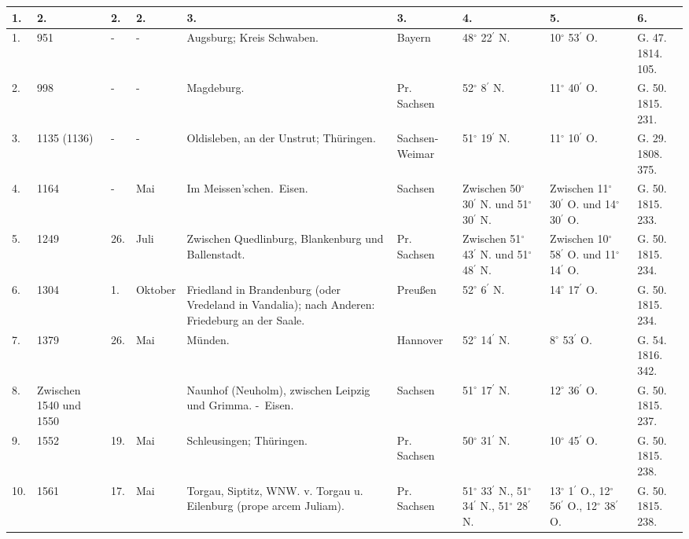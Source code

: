 \documentclass[a4paper, 8pt, oneside, polutonikogreek, german]{article}
\begin{document}
\begin{center}
    \footnotesize
    \begin{longtable}{|p{3mm}|p{10mm}|p{5mm}|p{13mm}|p{25mm}|p{13mm}|p{10mm}|p{10mm}|p{11mm}|}
    \hline
        1. & 2. & 2. & 2. & 3. & 3. & 4. & 5. & 6. \\ \hline
        1. & 951 & - & - & Augsburg; Kreis Schwaben. & Bayern & 48$^\circ$ 22$^\prime$ N. & 10$^\circ$ 53$^\prime$ O. & G. 47. 1814. 105. \\ \hline
        2. & 998 & - & - & Magdeburg. & Pr. Sachsen & 52$^\circ$ 8$^\prime$ N. & 11$^\circ$ 40$^\prime$ O. & G. 50. 1815. 231. \\ \hline
        3. & 1135 (1136) & - & - & Oldisleben, an der Unstrut; Thüringen. & Sachsen-Weimar & 51$^\circ$ 19$^\prime$ N. & 11$^\circ$ 10$^\prime$ O. & G. 29. 1808. 375. \\ \hline
        4. & 1164 & - & Mai & Im Meissen’schen. Eisen. & Sachsen & Zwischen 50$^\circ$ 30$^\prime$ N. und 51$^\circ$ 30$^\prime$ N. & Zwischen 11$^\circ$ 30$^\prime$ O. und 14$^\circ$ 30$^\prime$ O. & G. 50. 1815. 233. \\ \hline
        5. & 1249 & 26. & Juli & Zwischen Quedlinburg, Blankenburg und Ballenstadt. & Pr. Sachsen & Zwischen 51$^\circ$ 43$^\prime$ N. und 51$^\circ$ 48$^\prime$ N. & Zwischen 10$^\circ$ 58$^\prime$ O. und 11$^\circ$ 14$^\prime$ O. & G. 50. 1815. 234. \\ \hline
        6. & 1304 & 1. & Oktober & Friedland in Brandenburg (oder Vredeland in Vandalia); nach Anderen: Friedeburg an der Saale. & Preußen & 52$^\circ$ 6$^\prime$ N. & 14$^\circ$ 17$^\prime$ O. & G. 50. 1815. 234. \\ \hline
        7. & 1379 & 26. & Mai & Münden. & Hannover & 52$^\circ$ 14$^\prime$ N. & 8$^\circ$ 53$^\prime$ O. & G. 54. 1816. 342. \\ \hline
        8. & Zwischen 1540 und 1550 & ~ & ~ & Naunhof (Neuholm), zwischen Leipzig und Grimma. - Eisen. & Sachsen & 51$^\circ$ 17$^\prime$ N. & 12$^\circ$ 36$^\prime$ O. & G. 50. 1815. 237. \\ \hline
        9. & 1552 & 19. & Mai & Schleusingen; Thüringen. & Pr. Sachsen & 50$^\circ$ 31$^\prime$ N. & 10$^\circ$ 45$^\prime$ O. & G. 50. 1815. 238. \\ \hline
        10. & 1561 & 17. & Mai & Torgau, Siptitz, WNW. v. Torgau u. Eilenburg (prope arcem Juliam). & Pr. Sachsen & 51$^\circ$ 33$^\prime$ N., 51$^\circ$ 34$^\prime$ N., 51$^\circ$ 28$^\prime$ N. & 13$^\circ$ 1$^\prime$ O., 12$^\circ$ 56$^\prime$ O., 12$^\circ$ 38$^\prime$ O. & G. 50. 1815. 238. \\ \hline

\end{longtable}
\end{center}
\end{document}
